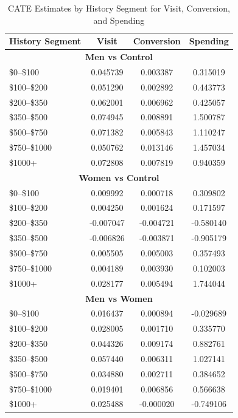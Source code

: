 \documentclass[10pt]{article}
\begin{document}
\begin{table}[H]
\centering
\small
\begin{tabular}{lccc}
\toprule
\textbf{History Segment} & \textbf{Visit} & \textbf{Conversion} & \textbf{Spending} \\
\midrule
\multicolumn{4}{c}{\textbf{Men vs Control}} \\
\midrule
\$0--\$100      & 0.045739 & 0.003387 & 0.315019 \\
\$100--\$200    & 0.051290 & 0.002892 & 0.443773 \\
\$200--\$350    & 0.062001 & 0.006962 & 0.425057 \\
\$350--\$500    & 0.074945 & 0.008891 & 1.500787 \\
\$500--\$750    & 0.071382 & 0.005843 & 1.110247 \\
\$750--\$1000   & 0.050762 & 0.013146 & 1.457034 \\
\$1000+         & 0.072808 & 0.007819 & 0.940359 \\
\midrule
\multicolumn{4}{c}{\textbf{Women vs Control}} \\
\midrule
\$0--\$100      & 0.009992 & 0.000718 & 0.309802 \\
\$100--\$200    & 0.004250 & 0.001624 & 0.171597 \\
\$200--\$350    & -0.007047 & -0.004721 & -0.580140 \\
\$350--\$500    & -0.006826 & -0.003871 & -0.905179 \\
\$500--\$750    & 0.005505 & 0.005003 & 0.357493 \\
\$750--\$1000   & 0.004189 & 0.003930 & 0.102003 \\
\$1000+         & 0.028177 & 0.005494 & 1.744044 \\
\midrule
\multicolumn{4}{c}{\textbf{Men vs Women}} \\
\midrule
\$0--\$100      & 0.016437 & 0.000894 & -0.029689 \\
\$100--\$200    & 0.028005 & 0.001710 & 0.335770 \\
\$200--\$350    & 0.044326 & 0.009174 & 0.882761 \\
\$350--\$500    & 0.057440 & 0.006311 & 1.027141 \\
\$500--\$750    & 0.034880 & 0.002711 & 0.384652 \\
\$750--\$1000   & 0.019401 & 0.006856 & 0.566638 \\
\$1000+         & 0.025488 & -0.000020 & -0.749106 \\
\bottomrule
\end{tabular}
\caption{CATE Estimates by History Segment for Visit, Conversion, and Spending}
\end{table}
\end{document}
